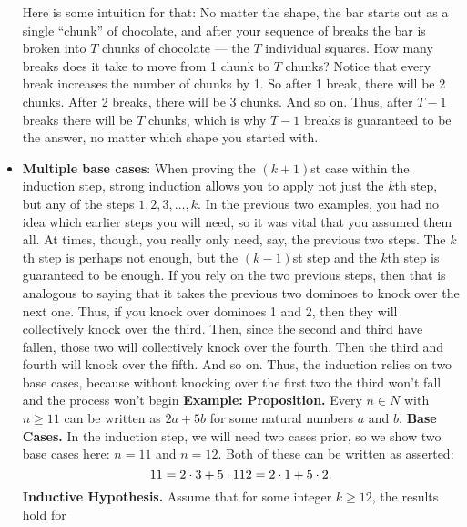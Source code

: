 \documentclass{report}
\begin{document}
\begin{itemize}
            \bigbreak \noindent 
            Here is some intuition for that: No matter the shape, the bar starts out as a  
            single “chunk” of chocolate, and after your sequence of breaks the bar is broken into  
            $T$ chunks of chocolate — the $T$ individual squares. How many breaks does it take to  
            move from 1 chunk to $T$ chunks? Notice that every break increases the number of  
            chunks by 1. So after 1 break, there will be 2 chunks. After 2 breaks, there will be 3  
            chunks. And so on. Thus, after $T - 1$ breaks there will be $T$ chunks, which is why  
            $T - 1$ breaks is guaranteed to be the answer, no matter which shape you started with.

        \item \textbf{Multiple base cases}: When proving the $(k + 1)$st case within the induction step, strong induction allows  you to apply not just the $k$th step, but any of the steps $1, 2, 3, \ldots, k$. In the previous  two examples, you had no idea which earlier steps you will need, so it was vital that  you assumed them all. At times, though, you really only need, say, the previous two  steps. The $k$th step is perhaps not enough, but the $(k - 1)$st step and the $k$th step is  guaranteed to be enough.
            \bigbreak \noindent 
            If you rely on the two previous steps, then that is analogous to saying that it takes the previous two dominoes to knock over the next one. Thus, if you knock over dominoes 1 and 2, then they will collectively knock over the third. Then, since the second and third have fallen, those two will collectively knock over the fourth. Then the third and fourth will knock over the fifth. And so on. Thus, the induction relies on two base cases, because without knocking over the first two the third won’t fall and the process won’t begin
            \bigbreak \noindent 
            \textbf{Example:} 
            \bigbreak \noindent 
            \textbf{Proposition.} Every $n \in N$ with $n \geq 11$ can be written as $2a + 5b$ for some natural numbers $a$ and $b$.
            \bigbreak \noindent 
            \textbf{Base Cases.} In the induction step, we will need two cases prior, so we show two base  
            cases here: $n = 11$ and $n = 12$. Both of these can be written as asserted:
            \[
                11 = 2 \cdot 3 + 5 \cdot 1 \\
                12 = 2 \cdot 1 + 5 \cdot 2.
            \]
            \textbf{Inductive Hypothesis.} Assume that for some integer $k \geq 12$, the results hold for  

\end{itemize}
\end{document}
